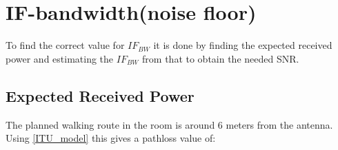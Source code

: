 %
%
%





\section{IF-bandwidth(noise floor)}
To find the correct value for $IF_{BW}$ it is done by finding the expected received power and estimating the $IF_{BW}$ from that to obtain the needed SNR. 

\subsection{Expected Received Power}
The planned walking route in the room is around 6 meters from the antenna. Using \autoref{ITU_model} this gives a pathloss value of:

